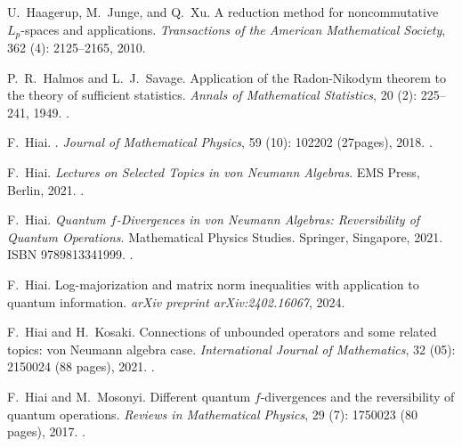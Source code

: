 \documentclass[12pt]{article}
\theoremstyle{definition}
\theoremstyle{remark}
\numberwithin{equation}{section}
\begin{document}
\begin{thebibliography}{27}
U.~Haagerup, M.~Junge, and Q.~Xu.
\newblock A reduction method for noncommutative $L_p$-spaces and applications.
\newblock \emph{Transactions of the American Mathematical Society}, 362
  (4): 2125--2165, 2010.

{\color{red}
P.~R.~Halmos and L.~J.~Savage.
\newblock Application of the Radon-Nikodym theorem to the theory of sufficient statistics.
\newblock \emph{Annals of Mathematical Statistics}, 20 (2): 
225--241, 1949.
\newblock {}.
}

F.~Hiai.
.
\newblock \emph{Journal of Mathematical Physics}, 59 (10):
 102202 (27pages), 2018.
 \newblock {}.

F.~Hiai.
\newblock \emph{Lectures on Selected Topics in von Neumann Algebras}.
\newblock EMS Press, Berlin, 2021{}.
\newblock {}.

F.~Hiai.
\newblock \emph{Quantum $f$-Divergences in von Neumann Algebras: Reversibility
  of Quantum Operations}.
\newblock Mathematical Physics Studies. Springer, Singapore,
  2021{}.
\newblock ISBN 9789813341999.
\newblock {}.

F.~Hiai.
\newblock Log-majorization and matrix norm inequalities with application to quantum
information.
\newblock \emph{arXiv preprint arXiv:2402.16067}, 2024.

F.~Hiai and H.~Kosaki.
\newblock Connections of unbounded operators and some related topics: von
  {N}eumann algebra case.
\newblock \emph{International Journal of Mathematics}, 32
  (05): 2150024 (88 pages), 2021.
\newblock {}.

F.~Hiai and M.~Mosonyi.
\newblock Different quantum $f$-divergences and the reversibility of quantum
  operations.
\newblock \emph{Reviews in Mathematical Physics}, 29 (7):
  1750023 (80 pages), 2017.
\newblock {}.


\end{thebibliography}
\end{document}
